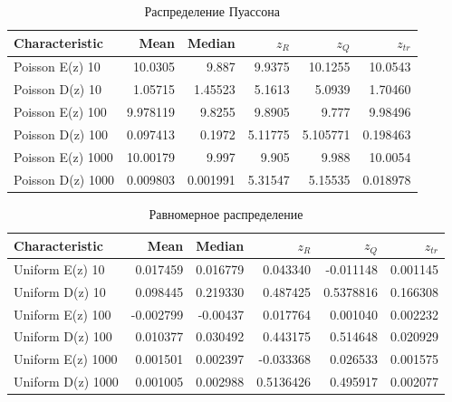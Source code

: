 	\begin{table}[ht]
		\centering
		\begin{tabular}[t]{lrrrrr}
			\hline
			Characteristic    &      Mean &   Median &       $z_R$ &      $z_Q$ &     $z_{tr}$ \\
			\hline
			Poisson E(z) 10   & 10.0305   & 9.887  	 &  9.9375   & 10.1255  & 10.0543     \\
			Poisson D(z) 10   &  1.05715  & 1.45523  &  5.1613   & 5.0939   & 1.70460  \\
			Poisson E(z) 100  & 9.978119   & 9.8255   & 9.8905   & 9.777 & 9.98496  \\
			Poisson D(z) 100  &  0.097413 & 0.1972  &  5.11775 & 5.105771 & 0.198463 \\
			Poisson E(z) 1000 & 10.00179   & 9.997   & 9.905    & 9.988  & 10.0054 \\
			Poisson D(z) 1000 &  0.009803 & 0.001991 &  5.31547 & 5.15535 & 0.018978 \\
			\hline
		\end{tabular}
		
		\caption{Распределение Пуассона}
		\label{tab:poisson}
	\end{table}

	\begin{table}[ht]
		\centering
		\begin{tabular}[t]{lrrrrr}
			\hline
			Characteristic    &      Mean &    Median &       $z_{R}$ &       $z_Q$ &      $z_{tr}$ \\
			\hline
			Uniform E(z) 10   &  0.017459 &  0.016779 &  0.043340 &  -0.011148 &  0.001145 \\
			Uniform D(z) 10   &  0.098445 &  0.219330 &  0.487425 &  0.5378816 &  0.166308 \\
			Uniform E(z) 100  &  -0.002799 &  -0.00437 &  0.017764 &  0.001040 &  0.002232 \\
			Uniform D(z) 100  &  0.010377 &  0.030492 &  0.443175 &  0.514648 &  0.020929 \\
			Uniform E(z) 1000 & 0.001501 & 0.002397 & -0.033368  & 0.026533 & 0.001575  \\
			Uniform D(z) 1000 &  0.001005 &  0.002988 &  0.5136426   &  0.495917 &  0.002077 \\
			\hline
		\end{tabular}
		\caption{Равномерное распределение}
		\label{tab:uniform}
	\end{table}